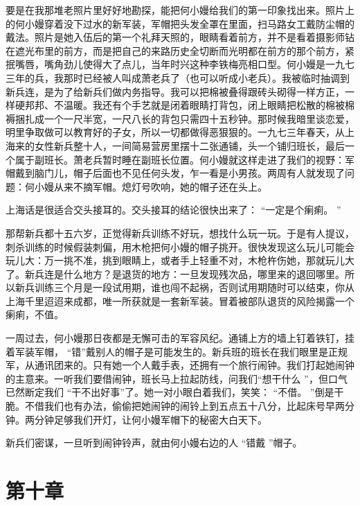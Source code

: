 \documentclass[12pt,twoside,openany]{book}
\begin{document}
要是在我那堆老照片里好好地勘探，能把何小嫚给我们的第一印象找出来。照片上的何小嫚穿着没下过水的新军装，军帽把头发全罩在里面，扫马路女工戴防尘帽的戴法。照片是她入伍后的第一个礼拜天照的，眼睛看着前方，并不是看着摄影师钻在遮光布里的前方，而是把自己的来路历史全切断而光明都在前方的那个前方，紧抿嘴唇，嘴角劲儿使得大了点儿，当年时兴这种李铁梅亮相口型。何小嫚是一九七三年的兵，我那时已经被人叫成萧老兵了（也可以听成小老兵）。我被临时抽调到新兵连，是为了给新兵们做内务指导。我可以把棉被叠得跟砖头砌得一样方正，一样硬邦邦、不温暖。我还有个手艺就是闭着眼睛打背包，闭上眼睛把松散的棉被棉褥捆扎成一个一尺半宽，一尺八长的背包只需四十五秒钟。那时候我暗里谈恋爱，明里争取做可以教育好的子女，所以一切都做得恶狠狠的。一九七三年春天，从上海来的女性新兵整十人，一间简易营房里摆十二张通铺，头一个铺归班长，最后一个属于副班长。萧老兵暂时睡在副班长位置。何小嫚就这样走进了我们的视野：军帽戴到脑门儿，帽子后面也不见任何头发，乍一看是小男孩。两周有人就发现了问题：何小嫚从来不摘军帽。熄灯号吹响，她的帽子还在头上。

上海话是很适合交头接耳的。交头接耳的结论很快出来了： “一定是个瘌痢。 ”

那帮新兵都十五六岁，正觉得新兵训练不好玩，想找什么玩一玩。于是有人提议，刺杀训练的时候假装刺偏，用木枪把何小嫚的帽子挑开。很快发现这么玩儿可能会玩儿大：万一挑不准，挑到眼睛上，或者手上轻重不对，木枪杵伤她，那就玩儿大了。新兵连是什么地方？是退货的地方：一旦发现残次品，哪里来的退回哪里。所以新兵训练三个月是一段试用期，谁也闯不起祸，否则试用期随时可以结束，你从上海千里迢迢来成都，唯一所获就是一套新军装。冒着被部队退货的风险揭露一个瘌痢，不值。

一周过去，何小嫚那日夜都是无懈可击的军容风纪。通铺上方的墙上钉着铁钉，挂着军装军帽， “错”戴别人的帽子是可能发生的。新兵班的班长在我们眼里是正规军，从通讯团来的。只有她一个人戴手表，还拥有一个旅行闹钟。我们打起她闹钟的主意来。一听我们要借闹钟，班长马上拉起防线，问我们“想干什么 ”，但口气已然断定我们 “干不出好事”了。她一对小眼白着我们，笑笑： “不借。 ”倒是干脆。不借我们也有办法，偷偷把她闹钟的闹铃上到五点五十八分，比起床号早两分钟。两分钟足够我们开灯，让何小嫚军帽下的秘密大白天下。

新兵们密谋，一旦听到闹钟铃声，就由何小嫚右边的人 “错戴 ”帽子。

\chapter{第十章}
\end{document}
